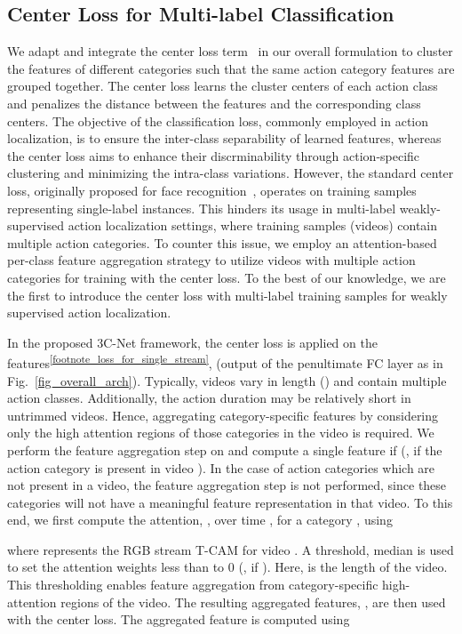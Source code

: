 \documentclass[10pt,twocolumn,letterpaper]{article}
\begin{document}
\subsection{Center Loss for Multi-label Classification\label{sec_center_loss}}
We adapt and integrate the center loss term~\cite{center_loss} in our overall formulation to cluster the features of different categories such that the same action category features are grouped together.
The center loss learns the cluster centers of each action class and penalizes the distance between the features and the corresponding class centers. The objective of the classification loss, commonly employed in action localization, is to ensure the inter-class separability of learned features, whereas the center loss aims to enhance their discrminability through action-specific clustering and minimizing the intra-class variations. However, the standard center loss, originally proposed for face recognition~\cite{center_loss}, operates on training samples representing single-label instances. This hinders its usage in multi-label weakly-supervised action localization settings, where training samples (videos) contain multiple action categories. To counter this issue, we employ an attention-based per-class feature aggregation strategy to utilize videos with multiple action categories for training with the center loss. To the best of our knowledge, we are the first to introduce the center loss with multi-label training samples for weakly supervised action localization.

In the proposed 3C-Net framework, the center loss is applied on the features\textsuperscript{\ref{footnote_loss_for_single_stream}},
 (output of the penultimate FC layer as in Fig.~\ref{fig_overall_arch}). 
Typically, videos vary in length () and contain multiple action classes. 
Additionally, the action duration may be relatively short in untrimmed videos.
Hence, aggregating category-specific features by considering only the high attention regions of those categories in the video is required.
We perform the feature aggregation step on  and compute a single feature  if  (\ie, if the action category  is present in video ). In the case of action categories which are not present in a video, the feature aggregation step is not performed, since these categories will not have a meaningful feature representation in that video.
To this end, we first compute the attention, , over time , for a category , using

where  represents the RGB stream T-CAM for video . A threshold, 
median
is used to set the attention weights less than  to 0 (\ie , if ). Here,  is the length of the video. This thresholding enables feature aggregation from category-specific high-attention regions of the video. The resulting aggregated features, , are then used with the center loss. 
The aggregated feature  is computed using 
\end{document}
